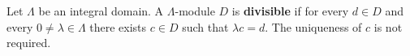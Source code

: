 Let $\Lambda$ be an integral domain. A $\Lambda$-module $D$ is \textbf{divisible} if for every $d \in D$ and every $0 \neq \lambda \in \Lambda$ there exists $c \in D$ such that $\lambda c = d$. The uniqueness of $c$ is not required.

